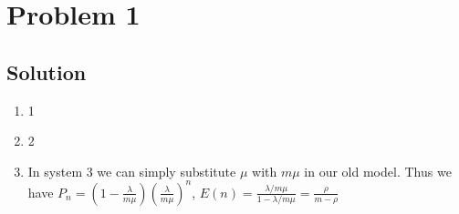 
\section*{Problem 1}

\subsection*{Solution}

\begin{enumerate}
    \item  1
    \item  2
    \item In system 3 we can simply substitute $\mu$ with $m\mu$ in our old model.
          Thus we have $P_n = (1-\frac{\lambda}{m\mu})(\frac{\lambda}{m\mu})^n$, $E(n) = \frac{\lambda/m\mu}{1-\lambda/m\mu} = \frac{\rho}{m-\rho}$
\end{enumerate}